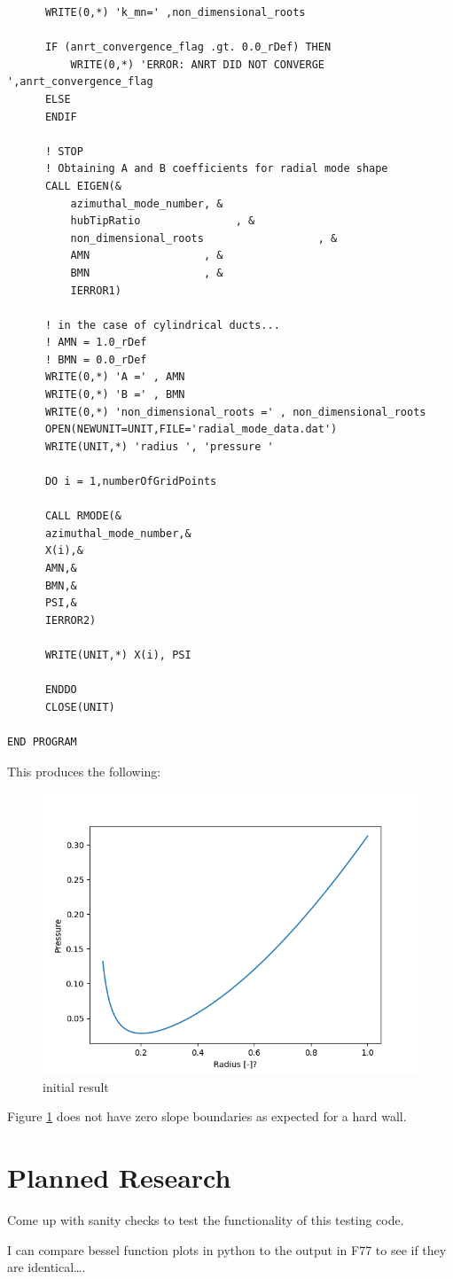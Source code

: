 \documentclass[12pt]{article}
\begin{document}
\begin{verbatim}
      WRITE(0,*) 'k_mn=' ,non_dimensional_roots

      IF (anrt_convergence_flag .gt. 0.0_rDef) THEN
          WRITE(0,*) 'ERROR: ANRT DID NOT CONVERGE ',anrt_convergence_flag
      ELSE
      ENDIF

      ! STOP
      ! Obtaining A and B coefficients for radial mode shape
      CALL EIGEN(&
          azimuthal_mode_number, &
          hubTipRatio               , &
          non_dimensional_roots                  , &
          AMN                  , &
          BMN                  , &
          IERROR1)

      ! in the case of cylindrical ducts...
      ! AMN = 1.0_rDef
      ! BMN = 0.0_rDef
      WRITE(0,*) 'A =' , AMN
      WRITE(0,*) 'B =' , BMN
      WRITE(0,*) 'non_dimensional_roots =' , non_dimensional_roots
      OPEN(NEWUNIT=UNIT,FILE='radial_mode_data.dat') 
      WRITE(UNIT,*) 'radius ', 'pressure '
       
      DO i = 1,numberOfGridPoints

      CALL RMODE(&
      azimuthal_mode_number,&
      X(i),&
      AMN,&
      BMN,&
      PSI,&
      IERROR2)
  
      WRITE(UNIT,*) X(i), PSI

      ENDDO
      CLOSE(UNIT)

END PROGRAM
\end{verbatim}
This produces the following:

\begin{figure}
    \centering
    \includegraphics{figures/Figure_1_1.png}
    \caption{initial result}
    \label{fig:dd}
\end{figure}



Figure \ref{fig:dd} does not have zero slope boundaries as expected for a hard 
wall.

\section{Planned Research} 
Come up with sanity checks to test the functionality of this testing code.

I can compare bessel function plots in python to the output in F77 to see if they are identical\dots.
 
\end{document}

